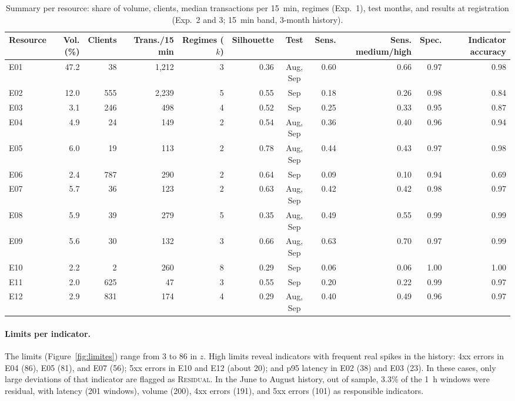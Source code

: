 \documentclass[sigconf,nonacm]{acmart}
\newcommand{\Residual}{\textsc{Residual}\xspace}
\begin{document}
\begin{table}[t]
  \caption{Summary per resource: share of volume, clients, median transactions per 15~min, regimes (Exp.~1), test months, and results at registration (Exp.~2 and 3; 15~min band, 3-month history).}
  \label{tab:recursos}
  \small
  \begin{tabular}{lrrrrrcrrrr}
    \toprule
    Resource & Vol. (\%) & Clients & Trans./15 min & Regimes ($k$) & Silhouette & Test & Sens. & Sens. medium/high & Spec. & Indicator accuracy \\
    \midrule
    E01 & 47.2 & 38  & 1,212 & 3 & 0.36 & Aug, Sep & 0.60 & 0.66 & 0.97 & 0.98 \\
    E02 & 12.0 & 555 & 2,239 & 5 & 0.55 & Sep & 0.18 & 0.26 & 0.98 & 0.84 \\
    E03 & 3.1  & 246 & 498   & 4 & 0.52 & Sep & 0.25 & 0.33 & 0.95 & 0.87 \\
    E04 & 4.9  & 24  & 149   & 2 & 0.54 & Aug, Sep & 0.36 & 0.40 & 0.96 & 0.94 \\
    E05 & 6.0  & 19  & 113   & 2 & 0.78 & Aug, Sep & 0.44 & 0.43 & 0.97 & 0.98 \\
    E06 & 2.4  & 787 & 290   & 2 & 0.64 & Sep & 0.09 & 0.10 & 0.94 & 0.69 \\
    E07 & 5.7  & 36  & 123   & 2 & 0.63 & Aug, Sep & 0.42 & 0.42 & 0.98 & 0.97 \\
    E08 & 5.9  & 39  & 279   & 5 & 0.35 & Aug, Sep & 0.49 & 0.55 & 0.99 & 0.99 \\
    E09 & 5.6  & 30  & 132   & 3 & 0.66 & Aug, Sep & 0.63 & 0.70 & 0.97 & 0.99 \\
    E10 & 2.2  & 2   & 260   & 8 & 0.29 & Sep & 0.06 & 0.06 & 1.00 & 1.00 \\
    E11 & 2.0  & 625 & 47    & 3 & 0.55 & Sep & 0.20 & 0.22 & 0.99 & 0.97 \\
    E12 & 2.9  & 831 & 174   & 4 & 0.29 & Aug, Sep & 0.40 & 0.49 & 0.96 & 0.97 \\
    \bottomrule
  \end{tabular}
\end{table}

\paragraph{Limits per indicator.} The limits (Figure~\ref{fig:limites}) range from 3 to 86 in $z$. High limits reveal indicators with frequent real spikes in the history: 4xx errors in E04 (86), E05 (81), and E07 (56); 5xx errors in E10 and E12 (about 20); and p95 latency in E02 (38) and E03 (23). In these cases, only large deviations of that indicator are flagged as \Residual. In the June to August history, out of sample, 3.3\% of the 1~h windows were residual, with latency (201 windows), volume (200), 4xx errors (191), and 5xx errors (101) as responsible indicators.
\end{document}
